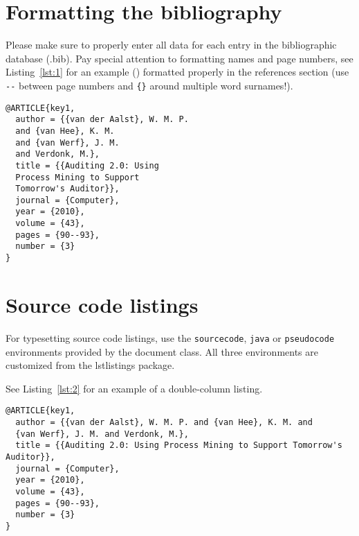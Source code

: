 \documentclass[british]{emisa}
\begin{document}
\begin{article}



\section{Formatting the bibliography}\label{sec:bib}

Please make sure to properly enter all data for each entry in the bibliographic database (.bib). Pay special attention to formatting names and page numbers, see Listing~\ref{lst:1} for an example (\cite{key1}) formatted properly in the references section (use \verb|--| between page numbers and \verb|{}| around multiple word surnames!). 

\begin{lstlisting}[float,caption={Enter your single-column listing caption here.},label={lst:1}]
@ARTICLE{key1,
  author = {{van der Aalst}, W. M. P. 
  and {van Hee}, K. M. 
  and {van Werf}, J. M. 
  and Verdonk, M.},
  title = {{Auditing 2.0: Using 
  Process Mining to Support 
  Tomorrow's Auditor}},
  journal = {Computer},
  year = {2010},
  volume = {43},
  pages = {90--93},
  number = {3}
}
\end{lstlisting}



\section{Source code listings}\label{sec:listings}

For typesetting source code listings, use the \verb|sourcecode|, \verb|java| or \verb|pseudocode| environments provided by the document class. All three environments are customized from the lstlistings package. 

See Listing~\ref{lst:2} for an example of a double-column listing.

\begin{lstlisting}[float=*htbp,caption={Enter your double-column listing caption here. Note that the listing width is too wide. Correct by entering a newline before, \eg, 'Tomorrow'.},label={lst:2}]
@ARTICLE{key1,
  author = {{van der Aalst}, W. M. P. and {van Hee}, K. M. and 
  {van Werf}, J. M. and Verdonk, M.},
  title = {{Auditing 2.0: Using Process Mining to Support Tomorrow's Auditor}},
  journal = {Computer},
  year = {2010},
  volume = {43},
  pages = {90--93},
  number = {3}
}
\end{lstlisting}




\end{article}
\end{document}

